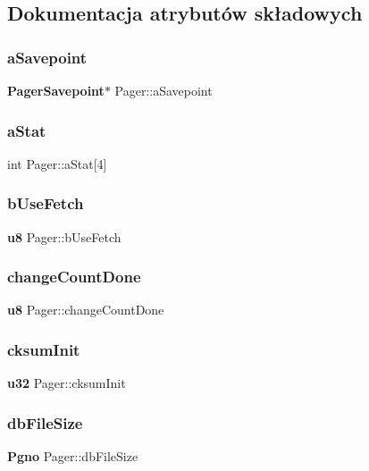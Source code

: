 \subsection{Dokumentacja atrybutów składowych}
\mbox{\label{struct_pager_a4d5f4487316c026eceb8461e90fffcfd}} 
\subsubsection{aSavepoint}
{\footnotesize\ttfamily \textbf{ Pager\+Savepoint}$\ast$ Pager\+::a\+Savepoint}

\mbox{\label{struct_pager_a66a1cc92ae259c21def1fb9cf6745d04}} 
\subsubsection{aStat}
{\footnotesize\ttfamily int Pager\+::a\+Stat[4]}

\mbox{\label{struct_pager_a35c15ace49e893cd5823222f549700e6}} 
\subsubsection{bUseFetch}
{\footnotesize\ttfamily \textbf{ u8} Pager\+::b\+Use\+Fetch}

\mbox{\label{struct_pager_a90c86a51ec6805d5702d32e456b0bcdc}} 
\subsubsection{changeCountDone}
{\footnotesize\ttfamily \textbf{ u8} Pager\+::change\+Count\+Done}

\mbox{\label{struct_pager_ad799667658328a44b471378a1b99623e}} 
\subsubsection{cksumInit}
{\footnotesize\ttfamily \textbf{ u32} Pager\+::cksum\+Init}

\mbox{\label{struct_pager_a1f8f55f49cb0ec91bfde4dca96a13f13}} 
\subsubsection{dbFileSize}
{\footnotesize\ttfamily \textbf{ Pgno} Pager\+::db\+File\+Size}

